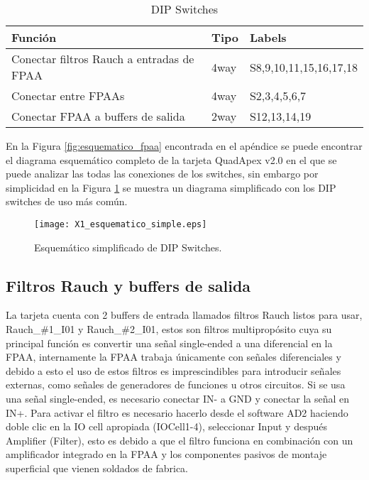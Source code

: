 	\begin{table}[!ht]
		\centering
		\begin{tabular}{|l|l|l|}
			\hline
			\textbf{Función} &  \textbf{Tipo} & \textbf{Labels}\\
			\hline
			Conectar filtros Rauch a entradas de FPAA 					& 4way 		& S8,9,10,11,15,16,17,18		\\
			\hline
			Conectar entre FPAAs 										& 4way 		& S2,3,4,5,6,7					\\
			\hline
			Conectar FPAA a buffers de salida 							& 2way 		& S12,13,14,19					\\
			\hline
		\end{tabular}
		\caption{DIP Switches}
		\label{tab:switches}
	\end{table}
	
	En la Figura \ref{fig:esquematico_fpaa} encontrada en el apéndice se puede encontrar el diagrama esquemático completo de la tarjeta QuadApex v2.0 en el que se puede analizar las todas las conexiones de los switches, sin embargo por simplicidad en la Figura \ref{fig:X1_esquematico_simple} se muestra un diagrama simplificado con los DIP switches de uso más común.
	
	\begin{figure}[!ht] 
		\caption{Esquemático simplificado de DIP Switches.}
		\label{fig:X1_esquematico_simple}
		\centering
		\texttt{[image: X1\_esquematico\_simple.eps]}
	\end{figure}
	
		\subsection{Filtros Rauch y buffers de salida}\label{sec:rauch}
	
	La tarjeta cuenta con 2 buffers de entrada llamados filtros Rauch listos para usar, Rauch\_\#1\_I01 y Rauch\_\#2\_I01, estos son filtros multipropósito cuya su principal función es convertir una señal single-ended a una diferencial en la FPAA, internamente la FPAA trabaja únicamente con señales diferenciales y debido a esto el uso de estos filtros es imprescindibles para introducir señales externas, como señales de generadores de funciones u otros circuitos. Si se usa una señal single-ended, es necesario conectar IN- a GND y conectar la señal en IN+.
	Para activar el filtro es necesario hacerlo desde el software AD2 haciendo doble clic en la IO cell apropiada (IOCell1-4), seleccionar Input y después Amplifier (Filter), esto es debido a que el filtro funciona en combinación con un amplificador integrado en la FPAA y los componentes pasivos de montaje superficial que vienen soldados de fabrica.
	
